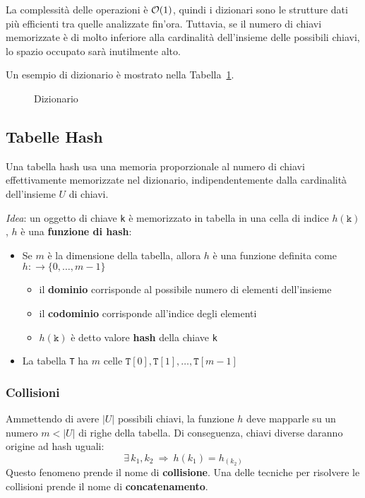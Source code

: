 \documentclass[italian, 10pt]{article}
\begin{document}
La complessità delle operazioni è \(\mathcal{O}(1)\), quindi i dizionari sono le strutture dati più efficienti tra quelle analizzate fin'ora.
Tuttavia, se il numero di chiavi memorizzate è di molto inferiore alla cardinalità dell'insieme delle possibili chiavi, lo spazio occupato sarà inutilmente alto.

\bigskip
Un esempio di dizionario è mostrato nella Tabella~\ref{fig:dizionario}.

\begin{figure}[htbp]
  \bigskip
  \centering
  \caption{Dizionario}
  \label{fig:dizionario}
  \bigskip
\end{figure}

\subsection{Tabelle Hash}

Una tabella hash usa una memoria proporzionale al numero di chiavi effettivamente memorizzate nel dizionario, indipendentemente dalla cardinalità dell'insieme \(U\) di chiavi.

\textit{Idea}: un oggetto di chiave \texttt{k} è memorizzato in tabella in una cella di indice \(h(\texttt{k})\), \(h\) è una \textbf{funzione di hash}:

\begin{itemize}
  \item Se \(m\) è la dimensione della tabella, allora \(h\) è una funzione definita come \(h: \rightarrow \{0, \ldots, m-1\}\)
        \begin{itemize}
          \item il \textbf{dominio} corrisponde al possibile numero di elementi dell'insieme
          \item il \textbf{codominio} corrisponde all'indice degli elementi
          \item \(h(\texttt{k})\) è detto valore \textbf{hash} della chiave \texttt{k}
        \end{itemize}
  \item La tabella \texttt{T} ha \(m\) celle \(\texttt{T}[0], \texttt{T}[1], \ldots, \texttt{T}[m-1]\)
\end{itemize}

\subsubsection{Collisioni}

Ammettendo di avere \(|U|\) possibili chiavi, la funzione \(h\) deve mapparle su un numero \(m < |U|\) di righe della tabella.
Di conseguenza, chiavi diverse daranno origine ad hash uguali:
\[\exists \, k_1, k_2 \ \Rightarrow \ h(k_1) = h_(k_2) \]
Questo fenomeno prende il nome di \textbf{collisione}.
Una delle tecniche per risolvere le collisioni prende il nome di \textbf{concatenamento}.
\end{document}
